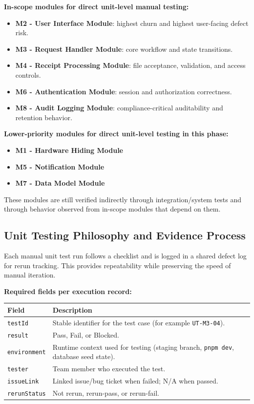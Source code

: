 \documentclass[12pt, titlepage]{article}
\begin{document}
\noindent\textbf{In-scope modules for direct unit-level manual testing:}
\begin{itemize}
  \item \textbf{M2 - User Interface Module}: highest churn and highest user-facing defect risk.
  \item \textbf{M3 - Request Handler Module}: core workflow and state transitions.
  \item \textbf{M4 - Receipt Processing Module}: file acceptance, validation, and access controls.
  \item \textbf{M6 - Authentication Module}: session and authorization correctness.
  \item \textbf{M8 - Audit Logging Module}: compliance-critical auditability and retention behavior.
\end{itemize}

\noindent\textbf{Lower-priority modules for direct unit-level testing in this phase:}
\begin{itemize}
  \item \textbf{M1 - Hardware Hiding Module}
  \item \textbf{M5 - Notification Module}
  \item \textbf{M7 - Data Model Module}
\end{itemize}

These modules are still verified indirectly through integration/system tests and
through behavior observed from in-scope modules that depend on them.

\subsection{Unit Testing Philosophy and Evidence Process}

Each manual unit test run follows a checklist and is logged in a shared defect
log for rerun tracking. This provides repeatability while preserving the speed
of manual iteration.

\noindent\textbf{Required fields per execution record:}
\begin{tabularx}{\textwidth}{p{3.0cm}X}
\toprule
\textbf{Field} & \textbf{Description} \\
\midrule
\texttt{testId} & Stable identifier for the test case (for example \texttt{UT-M3-04}). \\
\texttt{result} & Pass, Fail, or Blocked. \\
\texttt{environment} & Runtime context used for testing (staging branch, \texttt{pnpm dev}, database seed state). \\
\texttt{tester} & Team member who executed the test. \\
\texttt{issueLink} & Linked issue/bug ticket when failed; N/A when passed. \\
\texttt{rerunStatus} & Not rerun, rerun-pass, or rerun-fail. \\
\bottomrule
\end{tabularx}
\end{document}
